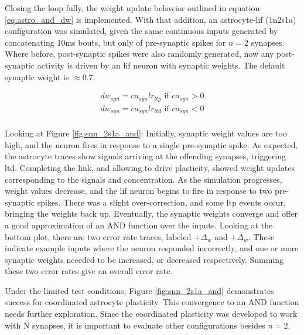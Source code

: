 Closing the loop fully, the weight update behavior outlined in equation
\ref{eq:astro_and_dw} is implemented. With that addition, an astrocyte-\gls{lif} (1n2s1a)
configuration was simulated, given the same continuous inputs generated by
concatenating 10ms bouts, but only of pre-synaptic spikes for $n=2$
synapses. Where before, post-synaptic spikes were also randomly generated, now
any post-synaptic activity is driven by an \gls{lif} neuron with synaptic weights.
The default synaptic weight is $\approx 0.7$.

\begin{align}
  dw_{syn} = ca_{syn} lr_{ltp} \textrm{ if } ca_{syn} >
  0 \label{eq:astro_and_dw} \\
  dw_{syn} = ca_{syn} lr_{ltd} \textrm{ if } ca_{syn} < 0 \\
\end{align}



Looking at Figure \ref{fig:snn_2s1a_and}: Initially, synaptic weight values are
too high, and the neuron fires in response to a single pre-synaptic spike. As
expected, the astrocyte traces show \dser signals arriving at the offending
synapses, triggering \gls{ltd}. Completing the link, and allowing \ca to drive
plasticity, showed weight updates corresponding to the \dser signals and \ca
concentration. As the simulation progresses, weight values decrease, and the \gls{lif}
neuron begins to fire in response to two pre-synaptic spikes. There was a slight
over-correction, and some \gls{ltp} events occur, bringing the weights back
up. Eventually, the synaptic weights converge and offer a good approximation of
an AND function over the inputs. Looking at the bottom plot, there are two error
rate traces, labeled $+\Delta_w$ and $+\Delta_w$. These indicate example inputs
where the neuron responded incorrectly, and one or more synaptic weights neeeded
to be increased, or decreased respectively. Summing these two error rates give
an overall error rate.

Under the limited test conditions, Figure \ref{fig:snn_2s1a_and} demonstrates
success for coordinated astrocyte plasticity. This convergence to an AND
function needs further exploration. Since the coordinated plasticity was
developed to work with N synapses, it is important to evaluate other
configurations besides $n=2$.

